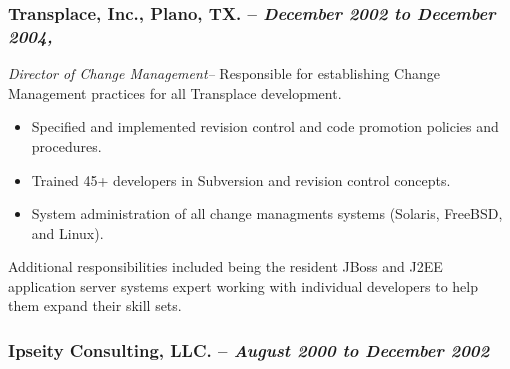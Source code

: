 \documentclass[10pt]{report}
\begin{document}
\subsubsection*{Transplace, Inc., Plano, TX. -- \emph{December 2002 to December
2004, }} \emph{Director of Change Management--} Responsible for establishing
Change Management practices for all Transplace development.

\begin{itemize}

	\item Specified and implemented revision control and code promotion policies
	and procedures.

	\item Trained 45+ developers in Subversion and revision control concepts.

	\item System administration of all change managments systems (Solaris,
	FreeBSD, and Linux).

\end{itemize}

Additional responsibilities included being the resident JBoss and J2EE
application server systems expert working with individual developers to help
them expand their skill sets.

\subsubsection*{Ipseity Consulting, LLC. -- \emph{August 2000 to December 2002}}
\end{document}

